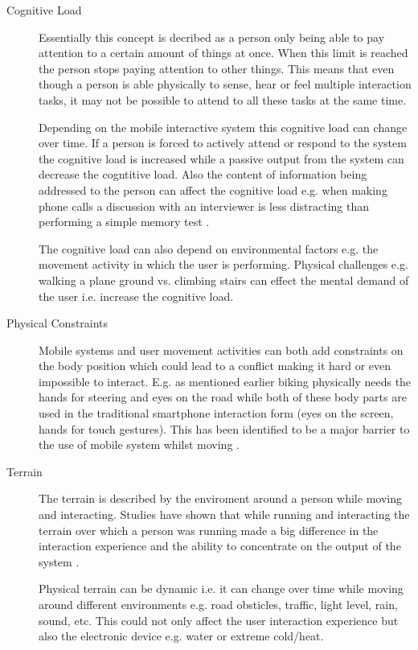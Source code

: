 \begin{description}
\item[Cognitive Load]
Essentially this concept is decribed as a person only being able to pay attention to a certain amount of things at once. When this limit is reached the person stops paying attention to other things. This means that even though a person is able physically to sense, hear or feel multiple interaction tasks, it may not be possible to attend to all these tasks at the same time.

Depending on the mobile interactive system this cognitive load can change over time. If a person is forced to actively attend or respond to the system the cognitive load is increased while a passive output from the system can decrease the cogntitive load. Also the content of information being addressed to the person can affect the cognitive load e.g. when making phone calls a discussion with an interviewer is less distracting than performing a simple memory test \cite{nunes_cognitive_2002}.

The cognitive load can also depend on environmental factors e.g. the movement activity in which the user is performing. Physical challenges e.g. walking a plane ground vs. climbing stairs can effect the mental demand of the user i.e. increase the cognitive load.

\item[Physical Constraints]
Mobile systems and user movement activities can both add constraints on the body position which could lead to a conflict making it hard or even impossible to interact. E.g. as mentioned earlier biking physically needs the hands for steering and eyes on the road while both of these body parts are used in the traditional smartphone interaction form (eyes on the screen, hands for touch gestures). This has been identified to be a major barrier to the use of mobile system whilst moving \cite{pielot_pocketmenu:_2012}.

\item[Terrain]
The terrain is described by the enviroment around a person while moving and interacting. Studies have shown that while running and interacting the terrain over which a person was running made a big difference in the interaction experience and the ability to concentrate on the output of the system \cite{marshall_using_2011}.

Physical terrain can be dynamic i.e. it can change over time while moving around different environments e.g. road obsticles, traffic, light level, rain, sound, etc. This could not only affect the user interaction experience but also the electronic device e.g. water or extreme cold/heat.


\end{description}
